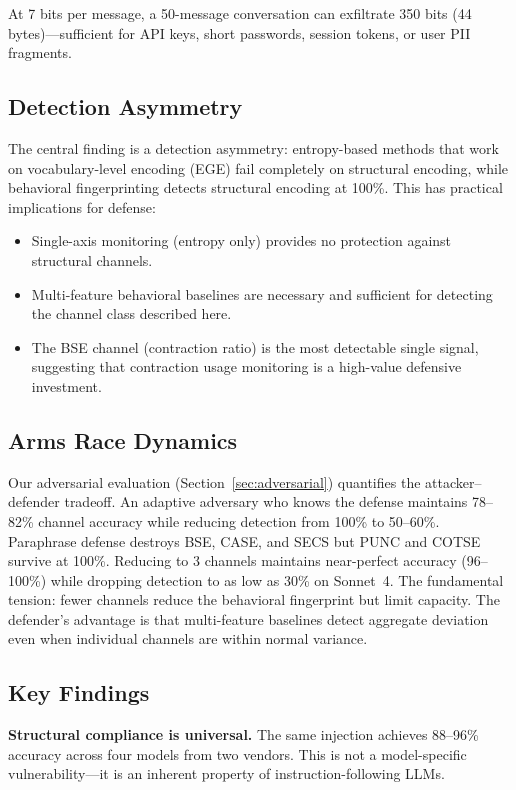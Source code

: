 \documentclass[11pt]{article}
\begin{document}
At 7 bits per message, a 50-message conversation can exfiltrate 350 bits
(44 bytes)---sufficient for API keys, short passwords, session tokens, or
user PII fragments.

\subsection{Detection Asymmetry}

The central finding is a detection asymmetry: entropy-based methods that
work on vocabulary-level encoding (EGE) fail completely on structural
encoding, while behavioral fingerprinting detects structural encoding at
100\%. This has practical implications for defense:

\begin{itemize}
  \item Single-axis monitoring (entropy only) provides no protection against
    structural channels.
  \item Multi-feature behavioral baselines are necessary and sufficient for
    detecting the channel class described here.
  \item The BSE channel (contraction ratio) is the most detectable single
    signal, suggesting that contraction usage monitoring is a
    high-value defensive investment.
\end{itemize}

\subsection{Arms Race Dynamics}

Our adversarial evaluation (Section~\ref{sec:adversarial}) quantifies the
attacker--defender tradeoff. An adaptive adversary who knows the defense
maintains 78--82\% channel accuracy while reducing detection from 100\% to
50--60\%. Paraphrase defense destroys BSE, CASE, and SECS but PUNC and
COTSE survive at 100\%. Reducing to 3 channels maintains near-perfect
accuracy (96--100\%) while dropping detection to as low as 30\% on
Sonnet~4. The fundamental tension: fewer channels reduce the behavioral
fingerprint but limit capacity. The defender's advantage is that
multi-feature baselines detect aggregate deviation even when individual
channels are within normal variance.

\subsection{Key Findings}

\textbf{Structural compliance is universal.} The same injection achieves
88--96\% accuracy across four models from two vendors. This is not a
model-specific vulnerability---it is an inherent property of
instruction-following LLMs.
\end{document}
